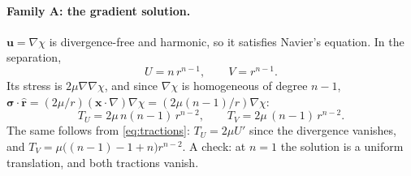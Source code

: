 \documentclass[11pt]{article}
\numberwithin{equation}{section}
\newcommand{\vu}{\mathbf{u}}
\newcommand{\vx}{\mathbf{x}}
\newcommand{\rhat}{\hat{\mathbf{r}}}
\newcommand{\bsig}{\bm{\sigma}}
\begin{document}
\paragraph{Family A: the gradient solution.} $\vu=\nabla\chi$ is
divergence-free and harmonic, so it satisfies Navier's equation. In the
separation,
\begin{equation}
  U = n\,r^{n-1},\qquad V = r^{n-1}.
\end{equation}
Its stress is $2\mu\nabla\nabla\chi$, and since $\nabla\chi$ is homogeneous
of degree $n-1$, $\bsig\cdot\rhat = (2\mu/r)(\vx\cdot\nabla)\nabla\chi =
(2\mu(n-1)/r)\nabla\chi$:
\begin{equation}
  T_U = 2\mu\,n(n-1)\,r^{n-2},\qquad T_V = 2\mu\,(n-1)\,r^{n-2}.
  \label{eq:familyA}
\end{equation}
The same follows from \eqref{eq:tractions}: $T_U = 2\mu U'$ since the
divergence vanishes, and $T_V = \mu\bigl((n-1) - 1 + n\bigr)r^{n-2}$. A
check: at $n=1$ the solution is a uniform translation, and both tractions
vanish.
\end{document}
